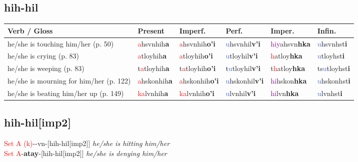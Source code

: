 \documentclass[oneside,openany]{book}%
\begin{document}
\subsection*{hih-hil}%
\begin{tabularx}{\textwidth}{>{\hsize=1.5\hsize\RaggedRight}X >{\hsize=0.9\hsize}X >{\hsize=0.9\hsize}X >{\hsize=0.9\hsize}X >{\hsize=0.9\hsize}X >{\hsize=0.9\hsize}X}%
\toprule%
\textbf{Verb / Gloss}&\textbf{Present}&\textbf{Imperf.}&\textbf{Perf.}&\textbf{Imper.}&\textbf{Infin.}\\%
\midrule%
he/she is touching him/her (p. 50)&\textcolor{Red}{a}hsvnhih\textbf{a}&\textcolor{Red}{a}hsvnhih\textbf{o'i}&\textcolor{RoyalBlue}{u}hsvnhil\textbf{v'i}&\textcolor{Purple}{hiy}ahsvn\textbf{hka}&\textcolor{RoyalBlue}{u}hsvnhst\textbf{i}\\%
he/she is crying (p. 83)&\textcolor{Red}{a}tloyhih\textbf{a}&\textcolor{Red}{a}tloyhih\textbf{o'i}&\textcolor{RoyalBlue}{u}tloyhil\textbf{v'i}&\textcolor{Red}{h}atloy\textbf{hka}&\textcolor{RoyalBlue}{u}tloyhst\textbf{i}\\%
he/she is weeping (p. 83)&t\textcolor{Red}{a}tloyhih\textbf{a}&t\textcolor{Red}{a}tloyhih\textbf{o'i}&t\textcolor{RoyalBlue}{u}tloyhil\textbf{v'i}&t\textcolor{Red}{h}atloy\textbf{hka}&ts\textcolor{RoyalBlue}{u}tloyhst\textbf{i}\\%
he/she is mourning for him/her (p. 122)&\textcolor{Red}{a}hskonhih\textbf{a}&\textcolor{Red}{a}hskonhih\textbf{o'i}&\textcolor{RoyalBlue}{u}hskonhil\textbf{v'i}&\textcolor{Purple}{hi}hskon\textbf{hka}&\textcolor{RoyalBlue}{u}hskonhst\textbf{i}\\%
he/she is beating him/her up (p. 149)&\textcolor{Red}{ka}lvnhih\textbf{a}&\textcolor{Red}{ka}lvnhih\textbf{o'i}&\textcolor{RoyalBlue}{u}lvnhil\textbf{v'i}&\textcolor{Purple}{hi}lvn\textbf{hka}&\textcolor{RoyalBlue}{u}lvnhst\textbf{i}\\%
\bottomrule%
\end{tabularx}%
\vspace{1em}%
\needspace{1in}%
\subsection*{hih-hil[imp2]}%
\textcolor{Red}{Set A (k)}{-}\textbf{}{-}vn{-}[hih-hil[imp2]] \textit{ he/she is hitting him/her} \\%
\textcolor{Red}{Set A}{-}\textbf{atay}{-}[hih-hil[imp2]] \textit{ he/she is denying him/her} \\%
\vspace{1em}%
\needspace{1in}%
\end{document}
